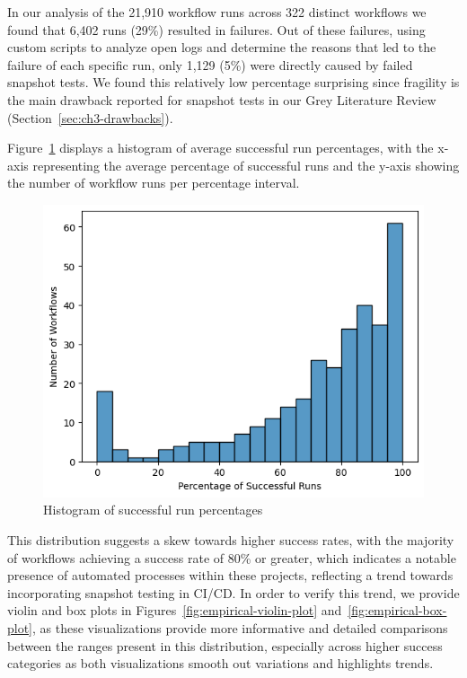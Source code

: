 \documentclass[
	msc, %
	english %
]{../ppgccufmg}
\begin{document}
        In our analysis of the 21,910 workflow runs across 322 distinct workflows we found that 6,402 runs (29\%) resulted in failures. Out of these failures, using custom scripts to analyze open logs and determine the reasons that led to the failure of each specific run, only 1,129 (5\%) were directly caused by failed snapshot tests. We found this relatively low percentage surprising since fragility is the main drawback reported for snapshot tests in our Grey Literature Review (Section~\ref{sec:ch3-drawbacks}).

        Figure~\ref{fig:empirical-histogram} displays a histogram of average successful run percentages, with the x-axis representing the average percentage of successful runs and the y-axis showing the number of workflow runs per percentage interval.

            \begin{figure}[h]
                \centering
                \includegraphics[scale=0.85]{exemplo/img/histogram.png}
                \caption{Histogram of successful run percentages}
                \label{fig:empirical-histogram}
            \end{figure}

        This distribution suggests a skew towards higher success rates, with the majority of workflows achieving a success rate of 80\% or greater, which indicates a notable presence of automated processes within these projects, reflecting a trend towards incorporating snapshot testing in CI/CD. In order to verify this trend, we provide violin and box plots in Figures~\ref{fig:empirical-violin-plot} and~\ref{fig:empirical-box-plot}, as these visualizations provide more informative and detailed comparisons between the ranges present in this distribution, especially across higher success categories as both visualizations smooth out variations and highlights trends.
\end{document}
